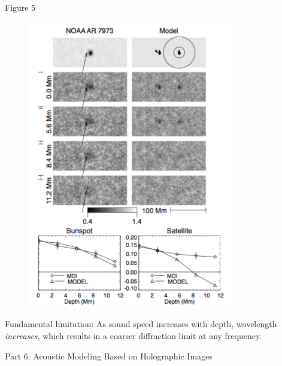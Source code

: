 \documentclass{beamer}
\begin{document}
\begin{frame}{Figure 5}
    \begin{figure}
        \includegraphics[width=0.8\textwidth]{fig_5.png}
    \end{figure}
\end{frame}

\begin{frame}{5.2}
\end{frame}

\begin{frame}{5.3}
\end{frame}

\begin{frame}{5.4}
\end{frame}

\begin{frame}{5.5}
    Fundamental limitation: As sound speed increases with depth, wavelength
    \emph{increases}, which results in a coarser diffraction limit at
    any frequency.
\end{frame}

\begin{frame}{Part 6: Acoustic Modeling Based on Holographic Images}
\end{frame}
\end{document}
